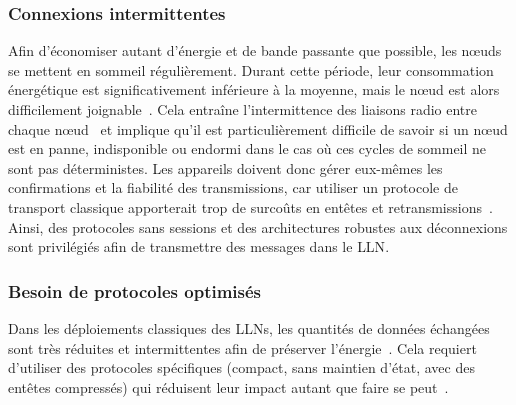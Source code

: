 \subsubsection{Connexions intermittentes}

Afin d'économiser autant d'énergie et de bande passante que possible, les nœuds se mettent en sommeil régulièrement.
Durant cette période, leur consommation énergétique est significativement inférieure à la moyenne, mais le nœud est alors difficilement joignable~\cite{kellner2008towards}.
Cela entraîne l'intermittence des liaisons radio entre chaque nœud~\cite{duarte2002analysis} et implique qu'il est particulièrement difficile de savoir si un nœud est en panne, indisponible ou endormi dans le cas où ces cycles de sommeil ne sont pas déterministes.
Les appareils doivent donc gérer eux-mêmes les confirmations et la fiabilité des transmissions, car utiliser un protocole de transport classique apporterait trop de surcoûts en entêtes et retransmissions~\cite{rfc7252}.
Ainsi, des protocoles sans sessions et des architectures robustes aux déconnexions sont privilégiés afin de transmettre des messages dans le \ac{LLN}.


\subsubsection{Besoin de protocoles optimisés}

Dans les déploiements classiques des \ac{LLN}s, les quantités de données échangées sont très réduites et intermittentes afin de préserver l'énergie~\cite{tan2010future}.
Cela requiert d'utiliser des protocoles spécifiques (compact, sans maintien d'état, avec des entêtes compressés) qui réduisent leur impact autant que faire se peut~\cite{Winter2012,shelby20116lowpan,rfc6690}.

